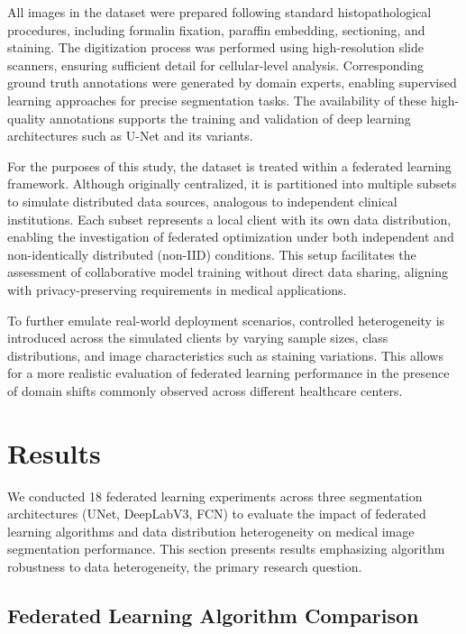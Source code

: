 \documentclass[conference]{IEEEtran}
\begin{document}
All images in the dataset were prepared following standard histopathological procedures, including formalin fixation, paraffin embedding, sectioning, and staining. The digitization process was performed using high-resolution slide scanners, ensuring sufficient detail for cellular-level analysis. Corresponding ground truth annotations were generated by domain experts, enabling supervised learning approaches for precise segmentation tasks. The availability of these high-quality annotations supports the training and validation of deep learning architectures such as U-Net and its variants.

For the purposes of this study, the dataset is treated within a federated learning framework. Although originally centralized, it is partitioned into multiple subsets to simulate distributed data sources, analogous to independent clinical institutions. Each subset represents a local client with its own data distribution, enabling the investigation of federated optimization under both independent and non-identically distributed (non-IID) conditions. This setup facilitates the assessment of collaborative model training without direct data sharing, aligning with privacy-preserving requirements in medical applications.

To further emulate real-world deployment scenarios, controlled heterogeneity is introduced across the simulated clients by varying sample sizes, class distributions, and image characteristics such as staining variations. This allows for a more realistic evaluation of federated learning performance in the presence of domain shifts commonly observed across different healthcare centers.

\section{Results}

We conducted 18 federated learning experiments across three segmentation architectures (UNet, DeepLabV3, FCN) to evaluate the impact of federated learning algorithms and data distribution heterogeneity on medical image segmentation performance. This section presents results emphasizing algorithm robustness to data heterogeneity, the primary research question.

\subsection{Federated Learning Algorithm Comparison}
\end{document}
